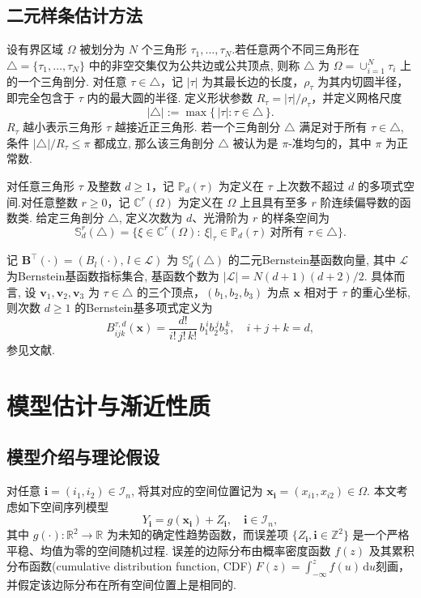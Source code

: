 \documentclass[a4paper,openay,14pt]{ctexbook}
\numberwithin{equation}{section}
\numberwithin{lem}{section}
\newcommand{\chapterwithfancyheader}[1]{  
    \chapter{#1} %
    \thispagestyle{fancy} %
}
\begin{document}
\section{二元样条估计方法}\label{BST}

设有界区域 $\Omega$ 被划分为 $N$ 个三角形 $\tau_{1},\ldots,\tau_{N}$.若任意两个不同三角形在 $\triangle=\{\tau_{1},\ldots,\tau_{N}\}$ 中的非空交集仅为公共边或公共顶点, 则称 $\triangle$ 为 $\Omega=\cup_{i=1}^N \tau_i$ 上的一个三角剖分. 对任意 $\tau\in\triangle$，记 $|\tau|$ 为其最长边的长度，$\rho_\tau$ 为其内切圆半径，即完全包含于 $\tau$ 内的最大圆的半径. 定义形状参数 $R_\tau=|\tau|/\rho_\tau$，并定义网格尺度
\[
|\triangle|:=\max\{\,|\tau|:\tau\in\triangle\,\}.
\]
$R_\tau$ 越小表示三角形 $\tau$ 越接近正三角形. 若一个三角剖分 \(\triangle\) 满足对于所有 \(\tau \in \triangle\), 条件 \(|\triangle|/R_\tau \leq \pi\) 都成立, 那么该三角剖分 \(\triangle\) 被认为是 \(\pi\)-准均匀的，其中 \(\pi\) 为正常数.

对任意三角形 $\tau$ 及整数 $d\ge 1$，记 $\mathbb{P}_d(\tau)$ 为定义在 $\tau$ 上次数不超过 $d$ 的多项式空间.对任意整数 $r\ge 0$，记 $\mathbb{C}^{r}(\Omega)$ 为定义在 $\Omega$ 上且具有至多 $r$ 阶连续偏导数的函数类. 给定三角剖分 $\triangle$, 定义次数为 $d$、光滑阶为 $r$ 的样条空间为
\begin{equation}\label{DEF:S_rd}
  \mathbb{S}_{d}^{r}(\triangle)
  = \bigl\{\xi\in \mathbb{C}^{r}(\Omega): \ \xi|_{\tau}\in \mathbb{P}_d(\tau)\ \text{对所有 } \tau\in\triangle \bigr\}.
\end{equation}

记 $\mathbf{B}^\top(\boldsymbol{\cdot})=\left(B_{l}(\boldsymbol{\cdot}),\,l\in\mathcal{L}\right)$ 为 $\mathbb{S}_{d}^{r}(\triangle)$ 的二元Bernstein基函数向量, 其中 $\mathcal{L}$ 为Bernstein基函数指标集合, 基函数个数为
$|\mathcal{L}|=N(d+1)(d+2)/2$.
具体而言, 设 $\mathbf{v}_1,\mathbf{v}_2,\mathbf{v}_3$ 为 $\tau\in\triangle$ 的三个顶点，$(b_1,b_2,b_3)$ 为点 $\boldsymbol{x}$ 相对于 $\tau$ 的重心坐标, 则次数 $d\ge 1$ 的Bernstein基多项式定义为
\[
B^{\tau,d}_{ijk}(\boldsymbol{x})
=\frac{d!}{i!\,j!\,k!}\,b_1^{\,i} b_2^{\,j} b_3^{\,k},
\quad i+j+k=d,
\]
参见文献\cite{lai2007spline}. 


\chapterwithfancyheader{模型估计与渐近性质}\label{SEC: result}
\section{模型介绍与理论假设}
对任意 \(\mathbf{i} = (i_1, i_2) \in \mathcal{I}_n\), 将其对应的空间位置记为 \(\boldsymbol{x}_{\mathbf{i}} = (x_{i1}, x_{i2}) \in \Omega\). 本文考虑如下空间序列模型
\begin{equation}\label{model:nonparbiregression}
   Y_{\mathbf{i}} = g(\boldsymbol{x}_{\mathbf{i}}) + Z_{\mathbf{i}}, 
   \quad \mathbf{i} \in \mathcal{I}_n,
\end{equation}
其中 \( g(\cdot): \mathbb{R}^2 \to \mathbb{R} \) 为未知的确定性趋势函数，而误差项
\(\{Z_{\mathbf{i}}, \mathbf{i} \in \mathbb{Z}^2\}\) 是一个严格平稳、均值为零的空间随机过程. 误差的边际分布由概率密度函数 \( f(z) \) 及其累积分布函数(cumulative distribution function, CDF)
\(F(z) = \int_{-\infty}^{z} f(u)\,\mathrm{d}u\)刻画，并假定该边际分布在所有空间位置上是相同的.
\end{document}
